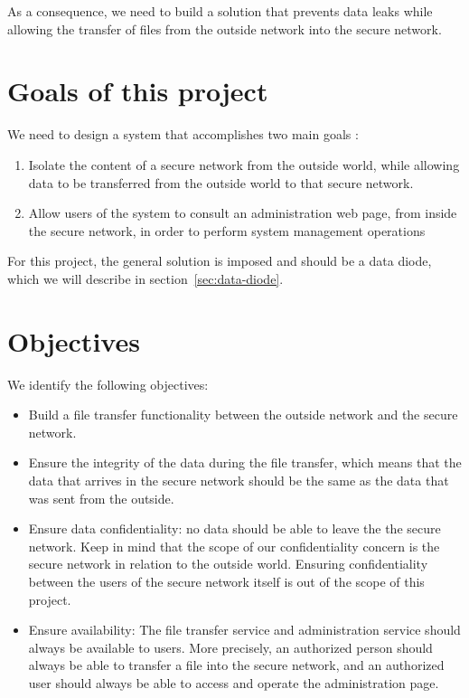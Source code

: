 \documentclass[a4paper,11pt]{article}
\begin{document}
As a consequence, we need to build a solution that prevents data leaks while allowing the transfer of files from the outside network into the secure network.

\section{Goals of this project}
We need to design a system that accomplishes two main goals :

\begin{enumerate}
\item{Isolate the content of a secure network from the outside world, while allowing data to be transferred from the outside world to that secure network.}
\item{Allow users of the system to consult an administration web page, from inside the secure network, in order to perform system management operations}
\end{enumerate}

For this project, the general solution is imposed and should be a data diode, which we will describe in section~\ref{sec:data-diode}.


\section{Objectives}
We identify the following objectives:
\begin{itemize}
\item{Build a file transfer functionality between the outside network and the secure network.}
\item{Ensure the integrity of the data during the file transfer, which means that the data that arrives in the secure network should be the same as the data that was sent from the outside.}
\item{Ensure data confidentiality: no data should be able to leave the the secure network. Keep in mind that the scope of our confidentiality concern is the secure network in relation to the outside world. Ensuring confidentiality between the users of the secure network itself is out of the scope of this project.}
\item{Ensure availability: The file transfer service and administration service should always be available to users. More precisely, an authorized person should always be able to transfer a file into the secure network, and an authorized user should always be able to access and operate the administration page.}
\end{itemize}
\end{document}
